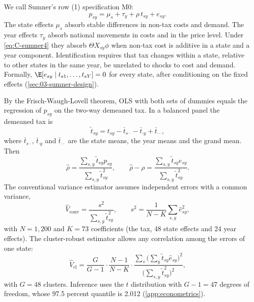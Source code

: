 We call Sumner's row (1) specification M0:
\begin{equation}\label{eq:C-M0}
p_{sy} = \mu_s + \tau_y + \rho\,t_{sy} + e_{sy} .
\end{equation}
The state effects $\mu_s$ absorb stable differences in non-tax costs and demand. The year effects $\tau_y$ absorb
national movements in costs and in the price level. Under \eqref{eq:C-sumner4} they absorb $\Theta X_{sy}\phi$ when
non-tax cost is additive in a state and a year component. Identification requires that tax changes within a state,
relative to other states in the same year, be unrelated to shocks to cost and demand. Formally,
$\E[e_{sy} \mid t_{s1}, \dots, t_{sY}] = 0$ for every state, after conditioning on the fixed effects
(\cref{sec:03-sumner-design}).

By the Frisch-Waugh-Lovell theorem, OLS with both sets of dummies equals the regression of $p_{sy}$ on the
two-way demeaned tax. In a balanced panel the demeaned tax is
\begin{equation*}
\tilde t_{sy} = t_{sy} - \bar t_{s\cdot} - \bar t_{\cdot y} + \bar t_{\cdot\cdot} ,
\end{equation*}
where $\bar t_{s\cdot}$, $\bar t_{\cdot y}$ and $\bar t_{\cdot\cdot}$ are the state means, the year means and the
grand mean. Then
\begin{equation}\label{eq:C-fwl}
\hat\rho = \frac{\sum_{s,y}\tilde t_{sy}p_{sy}}{\sum_{s,y}\tilde t_{sy}^2}, \qquad
\hat\rho - \rho = \frac{\sum_{s,y}\tilde t_{sy}e_{sy}}{\sum_{s,y}\tilde t_{sy}^2} .
\end{equation}
The conventional variance estimator assumes independent errors with a common variance,
\begin{equation*}
\hat V_{\text{conv}} = \frac{s^2}{\sum_{s,y}\tilde t_{sy}^2}, \qquad s^2 = \frac{1}{N - K}\sum_{s,y}\hat e_{sy}^2 ,
\end{equation*}
with $N = 1{,}200$ and $K = 73$ coefficients (the tax, 48 state effects and 24 year effects). The cluster-robust
estimator allows any correlation among the errors of one state:
\begin{equation}\label{eq:C-vcl}
\hat V_{\text{cl}} = \frac{G}{G - 1}\cdot\frac{N - 1}{N - K}\cdot
\frac{\sum_s\big(\sum_y\tilde t_{sy}\hat e_{sy}\big)^2}{\big(\sum_{s,y}\tilde t_{sy}^2\big)^2} ,
\end{equation}
with $G = 48$ clusters. Inference uses the $t$ distribution with $G - 1 = 47$ degrees of freedom, whose 97.5 percent
quantile is 2.012 (\cref{app:econometrics}).

